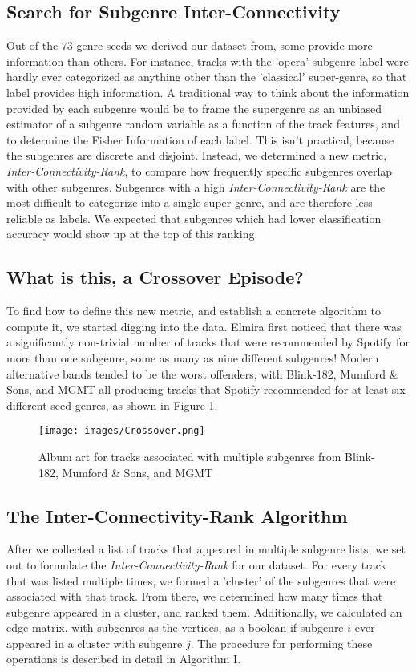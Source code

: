 \documentclass[conference]{IEEEtran}
\begin{document}
\subsection{Search for Subgenre Inter-Connectivity}
Out of the 73 genre seeds we derived our dataset from, some provide more information than others. For instance, tracks with the 'opera' subgenre label were hardly ever categorized as anything other than the 'classical' super-genre, so that label provides high information. A traditional way to think about the information provided by each subgenre would be to frame the supergenre as an unbiased estimator of a subgenre random variable as a function of the track features, and to determine the Fisher Information of each label. This isn't practical, because the subgenres are discrete and disjoint. Instead, we determined a new metric, \emph{Inter-Connectivity-Rank}, to compare how frequently specific subgenres overlap with other subgenres. Subgenres with a high \emph{Inter-Connectivity-Rank} are the most difficult to categorize into a single super-genre, and are therefore less reliable as labels. We expected that subgenres which had lower classification accuracy would show up at the top of this ranking.

\subsection{What is this, a Crossover Episode?}
To find how to define this new metric, and establish a concrete algorithm to compute it, we started digging into the data. Elmira first noticed that there was a significantly non-trivial number of tracks that were recommended by Spotify for more than one subgenre, some as many as nine different subgenres! Modern alternative bands tended to be the worst offenders, with Blink-182, Mumford \& Sons, and MGMT all producing tracks that Spotify recommended for at least six different seed genres, as shown in Figure \ref{fig:Crossover}.

\begin{figure}[htbp]
\centerline{\texttt{[image: images/Crossover.png]}}
\caption{Album art for tracks associated with multiple subgenres from Blink-182, Mumford \& Sons, and MGMT}
\label{fig:Crossover}
\end{figure}

\subsection{The Inter-Connectivity-Rank Algorithm}
After we collected a list of tracks that appeared in multiple subgenre lists, we set out to formulate the 
\emph{Inter-Connectivity-Rank} for our dataset. For every track that was listed multiple times, we formed
a 'cluster' of the subgenres that were associated with that track. From there, we determined how many 
times that subgenre appeared in a cluster, and ranked them. Additionally, we calculated an edge matrix,
with subgenres as the vertices, as a boolean if subgenre $i$ ever appeared in a cluster with subgenre $j$.
The procedure for performing these operations is described in detail in Algorithm I.
\end{document}
